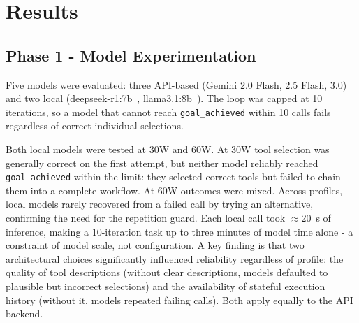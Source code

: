 \documentclass[preprint,12pt]{elsarticle}
\begin{document}
\begin{table}[H]
  \caption{MONAI segmentation inference times across hardware configurations for PANCREAS\_0001.}
  \label{tab:inference-results}
  \centering
  \small
\end{table}

\section{Results}
\label{sec:results}

\subsection{Phase 1  -  Model Experimentation}
Five models were evaluated: three API-based (Gemini 2.0 Flash, 2.5 Flash, 3.0)~\cite{gemini2025} and two local (deepseek-r1:7b~\cite{deepseekr1}, llama3.1:8b~\cite{llama31}). The loop was capped at 10 iterations, so a model that cannot reach \texttt{goal\_achieved} within 10 calls fails regardless of correct individual selections.

Both local models were tested at 30W and 60W. At 30W tool selection was generally correct on the first attempt, but neither model reliably reached \texttt{goal\_achieved} within the limit: they selected correct tools but failed to chain them into a complete workflow. At 60W outcomes were mixed. Across profiles, local models rarely recovered from a failed call by trying an alternative, confirming the need for the repetition guard. Each local call took $\approx$20~s of inference, making a 10-iteration task up to three minutes of model time alone - a constraint of model scale, not configuration. A key finding is that two architectural choices significantly influenced reliability regardless of profile: the quality of tool descriptions (without clear descriptions, models defaulted to plausible but incorrect selections) and the availability of stateful execution history (without it, models repeated failing calls). Both apply equally to the API backend.
\end{document}
